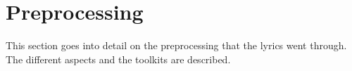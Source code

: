 \documentclass[10pt,a4paper]{article}
\begin{document}

	\section{Preprocessing}	
	\label{sec:preprocessing}
	This section goes into detail on the preprocessing that the lyrics went through. The different aspects and the toolkits are described. %
	
\end{document}

